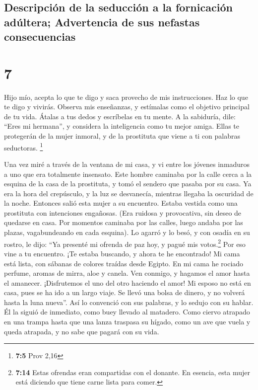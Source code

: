 \hypertarget{descripciuxf3n-de-la-seducciuxf3n-a-la-fornicaciuxf3n-aduxfaltera-advertencia-de-sus-nefastas-consecuencias}{%
\subsection{Descripción de la seducción a la fornicación adúltera;
Advertencia de sus nefastas
consecuencias}\label{descripciuxf3n-de-la-seducciuxf3n-a-la-fornicaciuxf3n-aduxfaltera-advertencia-de-sus-nefastas-consecuencias}}

\hypertarget{section-6}{%
\section{7}\label{section-6}}

 Hijo mío, acepta lo que te digo y saca provecho de mis
instrucciones.  Haz lo que te digo y vivirás. Observa mis
enseñanzas, y estímalas como el objetivo principal de tu vida.
 Átalas a tus dedos y escríbelas en tu mente.
 A la sabiduría, dile: ``Eres mi hermana'', y considera la
inteligencia como tu mejor amiga.  Ellas te protegerán de
la mujer inmoral, y de la prostituta que viene a ti con palabras
seductoras. \footnote{\textbf{7:5} Prov 2,16}

 Una vez miré a través de la ventana de mi casa,
 y vi entre los jóvenes inmaduros a uno que era totalmente
insensato.  Este hombre caminaba por la calle cerca a la
esquina de la casa de la prostituta, y tomó el sendero que pasaba por su
casa.  Ya era la hora del crepúsculo, y la luz se
desvanecía, mientras llegaba la oscuridad de la noche. 
Entonces salió esta mujer a su encuentro. Estaba vestida como una
prostituta con intenciones engañosas.  (Era ruidosa y
provocativa, sin deseo de quedarse en casa.  Por momentos
caminaba por las calles, luego andaba por las plazas, vagabundeando en
cada esquina).  Lo agarró y lo besó, y con osadía en su
rostro, le dijo:  ``Ya presenté mi ofrenda de paz hoy, y
pagué mis votos.\footnote{\textbf{7:14} Estas ofrendas eran compartidas
  con el donante. En esencia, esta mujer está diciendo que tiene carne
  lista para comer.}  Por eso vine a tu encuentro. ¡Te
estaba buscando, y ahora te he encontrado!  Mi cama está
lista, con sábanas de colores traídas desde Egipto.  En
mi cama he rociado perfume, aromas de mirra, aloe y canela.
 Ven conmigo, y hagamos el amor hasta el amanecer.
¡Disfrutemos el uno del otro haciendo el amor!  Mi esposo
no está en casa, pues se ha ido a un largo viaje.  Se
llevó una bolsa de dinero, y no volverá hasta la luna nueva''.
 Así lo convenció con sus palabras, y lo sedujo con su
hablar.  Él la siguió de inmediato, como buey llevado al
matadero. Como ciervo atrapado en una trampa  hasta que
una lanza traspasa su hígado, como un ave que vuela y queda atrapada, y
no sabe que pagará con su vida.


